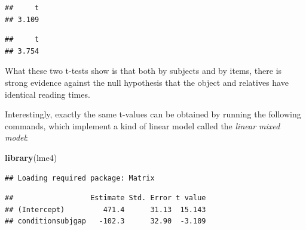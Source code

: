 \documentclass[12pt,]{krantz}
\newenvironment{Shaded}{\begin{snugshade}}{\end{snugshade}}
\newcommand{\DataTypeTok}[1]{\textcolor[rgb]{0.13,0.29,0.53}{#1}}
\newcommand{\DecValTok}[1]{\textcolor[rgb]{0.00,0.00,0.81}{#1}}
\newcommand{\KeywordTok}[1]{\textcolor[rgb]{0.13,0.29,0.53}{\textbf{#1}}}
\newcommand{\NormalTok}[1]{#1}
\newcommand{\OperatorTok}[1]{\textcolor[rgb]{0.81,0.36,0.00}{\textbf{#1}}}
\newcommand{\OtherTok}[1]{\textcolor[rgb]{0.56,0.35,0.01}{#1}}
\newcommand{\StringTok}[1]{\textcolor[rgb]{0.31,0.60,0.02}{#1}}
\begin{document}
\begin{verbatim}
##     t 
## 3.109
\end{verbatim}

\begin{Shaded}
\end{Shaded}

\begin{verbatim}
##     t 
## 3.754
\end{verbatim}

What these two t-tests show is that both by subjects and by items, there is strong evidence against the null hypothesis that the object and relatives have identical reading times.

Interestingly, exactly the same t-values can be obtained by running the following commands, which implement a kind of linear model called the \emph{linear mixed model}:

\begin{Shaded}
\begin{Highlighting}[]
\KeywordTok{library}\NormalTok{(lme4)}
\end{Highlighting}
\end{Shaded}

\begin{verbatim}
## Loading required package: Matrix
\end{verbatim}

\begin{Shaded}
\end{Shaded}

\begin{verbatim}
##                  Estimate Std. Error t value
## (Intercept)         471.4      31.13  15.143
## conditionsubjgap   -102.3      32.90  -3.109
\end{verbatim}
\end{document}
